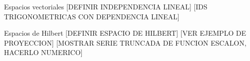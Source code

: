 \documentclass[12pt,aspectratio=169,xcolor=dvipsnames]{beamer}
\begin{document}
\begin{frame}
\end{frame}
\begin{frame}{Espacios vectoriales}
    [DEFINIR INDEPENDENCIA LINEAL]
    [IDS TRIGONOMETRICAS CON DEPENDENCIA LINEAL]
\end{frame}
\begin{frame}{Espacios de Hilbert}
    [DEFINIR ESPACIO DE HILBERT]
    [VER EJEMPLO DE PROYECCION]
    [MOSTRAR SERIE TRUNCADA DE FUNCION ESCALON, HACERLO NUMERICO]
\end{frame}
\begin{frame}
    \maketitle
\end{frame}
\end{document}
